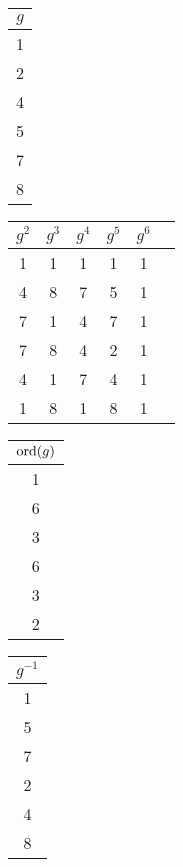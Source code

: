 \begin{center}
\begin{tabular}{|c|}
	\hline
	$g$\\
	\hline
	1\\2\\4\\5\\7\\8\\
	\hline
\end{tabular}
\begin{tabular}{|c|c|c|c|c|c|}
	\hline
	$g^2$&$g^3$&$g^4$&$g^5$&$g^6$\\
	\hline
	1&1&1&1&1\\
	4&8&7&5&1\\
	7&1&4&7&1\\
	7&8&4&2&1\\
	4&1&7&4&1\\
	1&8&1&8&1\\
	\hline
\end{tabular}
\begin{tabular}{|c|}
	\hline
	$\operatorname{ord}(g)$\\
	\hline
	1\\6\\3\\6\\3\\2\\
	\hline
\end{tabular}
\begin{tabular}{|c|}
	\hline
	$g^{-1}$\\
	\hline
	1\\5\\7\\2\\4\\8\\
	\hline
\end{tabular}
\end{center}
